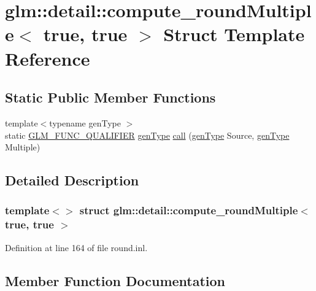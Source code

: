 \hypertarget{structglm_1_1detail_1_1compute__round_multiple_3_01true_00_01true_01_4}{}\section{glm\+::detail\+::compute\+\_\+round\+Multiple$<$ true, true $>$ Struct Template Reference}
\label{structglm_1_1detail_1_1compute__round_multiple_3_01true_00_01true_01_4}
\subsection*{Static Public Member Functions}
\begin{DoxyCompactItemize}
\item 
{\footnotesize template$<$typename gen\+Type $>$ }\\static \mbox{\hyperlink{setup_8hpp_a33fdea6f91c5f834105f7415e2a64407}{G\+L\+M\+\_\+\+F\+U\+N\+C\+\_\+\+Q\+U\+A\+L\+I\+F\+I\+ER}} \mbox{\hyperlink{structglm_1_1detail_1_1gen_type}{gen\+Type}} \mbox{\hyperlink{structglm_1_1detail_1_1compute__round_multiple_3_01true_00_01true_01_4_ad2ba30e3338e768e6119c957f44b2216}{call}} (\mbox{\hyperlink{structglm_1_1detail_1_1gen_type}{gen\+Type}} Source, \mbox{\hyperlink{structglm_1_1detail_1_1gen_type}{gen\+Type}} Multiple)
\end{DoxyCompactItemize}


\subsection{Detailed Description}
\subsubsection*{template$<$$>$\newline
struct glm\+::detail\+::compute\+\_\+round\+Multiple$<$ true, true $>$}



Definition at line 164 of file round.\+inl.



\subsection{Member Function Documentation}
\mbox{\label{structglm_1_1detail_1_1compute__round_multiple_3_01true_00_01true_01_4_ad2ba30e3338e768e6119c957f44b2216}} 
